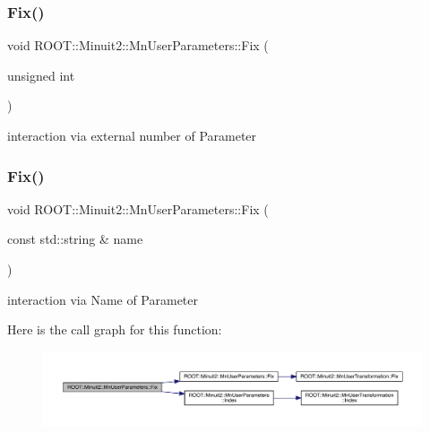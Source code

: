 \subsubsection{\texorpdfstring{Fix()}{Fix()}\hspace{0.1cm}{\footnotesize\ttfamily [2/4]}}
{\footnotesize\ttfamily void R\+O\+O\+T\+::\+Minuit2\+::\+Mn\+User\+Parameters\+::\+Fix (\begin{DoxyParamCaption}\item[{unsigned int}]{ }\end{DoxyParamCaption})}



interaction via external number of Parameter 

\mbox{\label{classROOT_1_1Minuit2_1_1MnUserParameters_a2ae09cd0fae9785d4c097439862ab63b}} 
\subsubsection{\texorpdfstring{Fix()}{Fix()}\hspace{0.1cm}{\footnotesize\ttfamily [3/4]}}
{\footnotesize\ttfamily void R\+O\+O\+T\+::\+Minuit2\+::\+Mn\+User\+Parameters\+::\+Fix (\begin{DoxyParamCaption}\item[{const std\+::string \&}]{name }\end{DoxyParamCaption})}



interaction via Name of Parameter 

Here is the call graph for this function\+:\nopagebreak
\begin{figure}[H]
\begin{center}
\leavevmode
\includegraphics[width=350pt]{d6/d10/classROOT_1_1Minuit2_1_1MnUserParameters_a2ae09cd0fae9785d4c097439862ab63b_cgraph}
\end{center}
\end{figure}
\mbox{\label{classROOT_1_1Minuit2_1_1MnUserParameters_a2ae09cd0fae9785d4c097439862ab63b}} 
